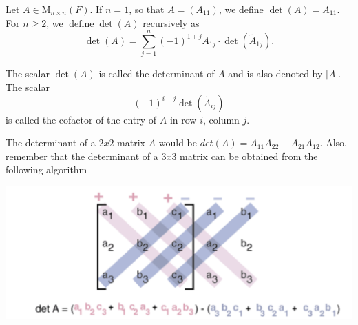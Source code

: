 \documentclass{report}
\begin{document}
    \begin{defBox}
        Let $A \in \mathrm{M}_{n \times n}(F)$. If $n=1$, so that $A=\left(A_{11}\right)$, we define $\operatorname{det}(A)=A_{11}$. For $n \geq 2$, we $\operatorname{define} \operatorname{det}(A)$ recursively as
        $$
        \operatorname{det}(A)=\sum_{j=1}^n(-1)^{1+j} A_{1 j} \cdot \operatorname{det}\left(\tilde{A}_{1 j}\right) .
        $$
    \end{defBox}

    The scalar $\operatorname{det}(A)$ is called the determinant of $A$ and is also denoted by $|A|$. The scalar
    $$
    (-1)^{i+j} \operatorname{det}\left(\tilde{A}_{i j}\right)
    $$
    is called the cofactor of the entry of $A$ in row $i$, column $j$.

    The determinant of a $2x2$ matrix $A$ would be $det(A) = A_{11}A_{22} - A_{21}A_{12}$. Also, remember that the determinant of a $3x3$ matrix can be obtained from the following algorithm
    \begin{center}
        \includegraphics[width=1\textwidth]{images/3x3det.png}
    \end{center}
\end{document}
